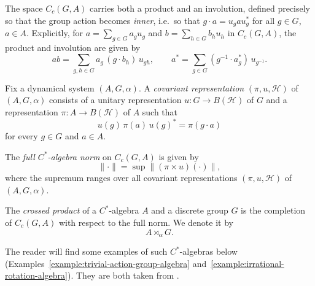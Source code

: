 The space \( C_c(G,A) \) carries both a product and an
involution, defined precisely so that the group action becomes
\emph{inner}, i.e.\ so that \( g \cdot a = u_g a u_g^* \) for all
\( g \in G \), \( a \in A \). Explicitly, for
\( a = \sum_{g \in G} a_g u_g \) and \( b = \sum_{h \in G} b_h u_h \) in
\( C_c(G,A) \), the product and involution are given by
\[
    ab = \sum_{g,h \in G} a_g\,(g \cdot b_h)\, u_{gh},
    \qquad
    a^* = \sum_{g \in G} (g^{-1} \cdot a_g^*)\, u_{g^{-1}}.
\]

\begin{definition}
    \label{def:covariant-representation}
    Fix a dynamical system \( (A, G, \alpha) \). A \emph{covariant
    representation} \( (\pi, u, \mathcal{H}) \) of \( (A,G,\alpha) \)
    consists of a unitary representation
    \( u \colon G \to B(\mathcal{H}) \) of \( G \) and a representation
    \( \pi \colon A \to B(\mathcal{H}) \) of \( A \) such that
    \[
        u(g)\,\pi(a)\,u(g)^* = \pi(g \cdot a)
    \]
    for every \( g \in G \) and \( a \in A \).
\end{definition}

\begin{definition}
    \label{def:full-cstar-norm}
    The \emph{full \( C^{*} \)-algebra norm} on \( C_c(G,A) \) is
    given by
    \[
        \| \cdot \| = \sup \| (\pi \times u)(\cdot) \|,
    \]
    where the supremum ranges over all covariant representations
    \( (\pi, u, \mathcal{H}) \) of \( (A,G,\alpha) \).
\end{definition}

\begin{definition}
    \label{def:crossed-product-cstar-algebra}
    The \emph{crossed product} of a \( C^{*} \)-algebra \( A \) and a
    discrete group \( G \) is the completion of \( C_c(G,A) \)
    with respect to the full norm. We denote it by
    \[
        A \rtimes_{\alpha} G.
    \]
\end{definition}

The reader will find some examples of such \(C^{*}\)-algebras below
(Examples~\ref{example:trivial-action-group-algebra}
and~\ref{example:irrational-rotation-algebra}). They are both taken
from \textcite{blackadar}.


